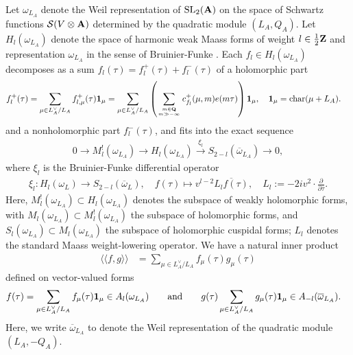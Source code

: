 \documentclass{amsart}
\theoremstyle{definition}
\begin{document}
Let $\omega_{L_A}$ denote the Weil representation of $\operatorname{SL}_2({\bf{A}})$ 
on the space of Schwartz functions $\mathcal{S}(V \otimes {\bf{A}})$ determined by the quadratic module $(L_A, Q_A)$. 
Let $H_l(\omega_{L_A})$ denote the space of harmonic weak Maass forms of weight $l \in \frac{1}{2}{\bf{Z}}$ and representation $\omega_{L_A}$ in the sense of 
Bruinier-Funke \cite{BF}. Each $f_l \in H_l(\omega_{L_A})$ decomposes as a sum $f_l(\tau) = f_l^+(\tau) + f_l^-(\tau)$ of a holomorphic part 
\begin{align*} f_{l}^+(\tau) &= \sum\limits_{ \mu \in L_A^{\vee}/L_A} f^+_{l, \mu} (\tau) {\bf{1}}_{\mu} =  \sum\limits_{ \mu \in L_A^{\vee}/L_A} 
\left( \sum\limits_{m \in {\bf{Q}} \atop m \gg - \infty} c^{+}_{f_{l}}(\mu, m) e(m \tau)\right)  {\bf{1}}_{\mu}, \quad {\bf{1}}_{\mu} = \operatorname{char}(\mu + L_A). \end{align*} 
and a nonholomorphic part $f_l^-(\tau)$, and fits into the exact sequence
\begin{align*} 0 \to M_l^!(\omega_{L_A}) \to H_l(\omega_{L_A}) \overset{\xi_l}{\longrightarrow} S_{2-l}(\overline{\omega}_{L_A}) \to 0, \end{align*}
where $\xi_l$ is the Bruinier-Funke differential operator
\begin{align*} \xi_l: H_l(\omega_L) \longrightarrow S_{2-l}(\overline{\omega}_L), \quad f(\tau) \longmapsto v^{l-2} \overline{L_l f(\tau)}, 
\quad L_l := - 2 i v^2 \cdot \frac{\partial }{ \partial \overline{\tau}}. \end{align*}
Here, $M^!_{l}(\omega_{L_A}) \subset H_{l}(\omega_{L_A})$ denotes the subspace of weakly holomorphic forms, 
with $M_{l}(\omega_{L_A}) \subset M^!_{l}(\omega_{L_A}) $ the subspace of holomorphic forms, 
and $S_{l}(\omega_{L_A}) \subset M_{l}(\omega_{L_A})$ the subspace of holomorphic cuspidal forms; $L_l$ denotes the standard Maass weight-lowering operator. 
We have a natural inner product 
\begin{align*} \langle \langle f, g \rangle \rangle &= \sum\limits_{  \mu \in L_A^{\vee}/L_A } f_{\mu}(\tau) g_{\mu}(\tau) \end{align*} 
defined on vector-valued forms
\begin{align*} f(\tau) &= \sum\limits_{  \mu \in L_A^{\vee}/L_A } f_{\mu}(\tau) {\bf{1}}_{\mu} \in A_{l}(\omega_{L_A})
\quad \text{~~~and~~~} \quad g(\tau) \sum\limits_{  \mu \in L_A^{\vee}/L_A } g_{\mu}(\tau) {\bf{1}}_{\mu} \in A_{-l}(\overline{\omega}_{L_A}).\end{align*} 
Here, we write $\overline{\omega}_{L_A}$ to denote the Weil representation of the quadratic module $(L_A, -Q_A)$. 
\end{document}
